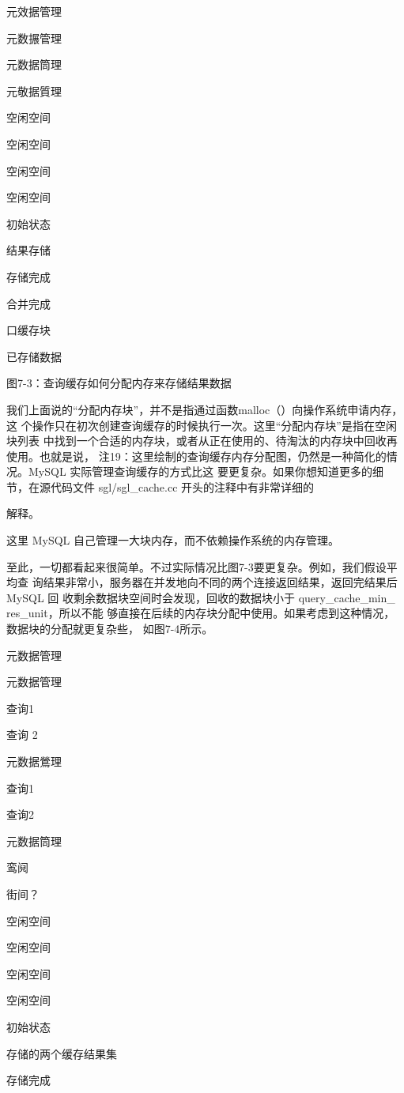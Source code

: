 元效据管理

元数搌管理

元数据筒理

元敬据質理

空闲空间

空闲空间

空闲空间

空闲空间

初始状态

结果存储

存储完成

合并完成

口缓存块

已存储数据

图7-3：查询缓存如何分配内存来存储结果数据

我们上面说的“分配内存块”，并不是指通过函数malloc（）向操作系统申请内存，这
个操作只在初次创建查询缓存的时候执行一次。这里“分配内存块”是指在空闲块列表
中找到一个合适的内存块，或者从正在使用的、待淘汰的内存块中回收再使用。也就是说，
注19：这里绘制的查询缓存内存分配图，仍然是一种简化的情况。MySQL 实际管理查询缓存的方式比这
要更复杂。如果你想知道更多的细节，在源代码文件 sgl/sgl\_cache.cc 开头的注释中有非常详细的

解释。

这里 MySQL 自己管理一大块内存，而不依赖操作系统的内存管理。

至此，一切都看起来很简单。不过实际情况比图7-3要更复杂。例如，我们假设平均查
询结果非常小，服务器在并发地向不同的两个连接返回结果，返回完结果后 MySQL 回
收剩余数据块空间时会发现，回收的数据块小于 query\_cache\_min\_ res\_unit，所以不能
够直接在后续的内存块分配中使用。如果考虑到这种情况，数据块的分配就更复杂些，
如图7-4所示。

元数据管理

元数据管理

查询1

查询 2

元数据鶯理

查询1

查询2

元数据筒理

鸾阋

街间？

空闲空间

空闲空间

空闲空间

空闲空间

初始状态

存储的两个缓存结果集

存储完成

